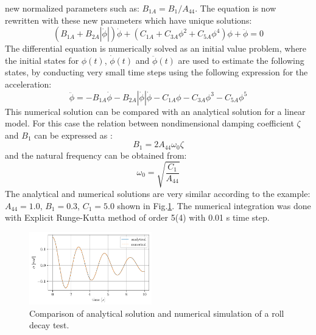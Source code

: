 new normalized parameters such as: $B_{1A} = B_1/A_{44}$. The equation
is now rewritten with these new parameters which have unique solutions:
\begin{equation}
\left(B_{1A} + B_{2A} \left|{\dot{\phi}}\right|\right) \dot{\phi} + \left(C_{1A} + C_{3A} \phi^{2} + C_{5A} \phi^{4}\right) \phi + \ddot{\phi} = 0
\label{eq:roll_decay_equation_quadratic_A}
\end{equation}
The differential equation is numerically solved as an initial value
problem, where the initial states for $\phi(t)$, $\dot{\phi}(t)$ and
$\ddot{\phi}(t)$ are used to estimate the following states, by
conducting very small time steps using the following expression for the
acceleration:
\begin{equation}
\ddot{\phi} = - B_{1A} \dot{\phi} - B_{2A} \left|{\dot{\phi}}\right| \dot{\phi} - C_{1A} \phi - C_{3A} \phi^{3} - C_{5A} \phi^{5}
\label{eq:eq_phi1d}
\end{equation}
This numerical solution can be compared with an analytical solution
\citep{7505983/KL7A3RIV} for a linear model.
For this
case the relation between nondimensional damping coefficient $\zeta$
and $B_1$ can be expressed as \citep{7505983/FB64RGPF}:
\begin{equation}
B_{1} = 2 A_{44} \omega_{0} \zeta
\label{eq:B_1_zeta_eq}
\end{equation}
and the natural frequency can be obtained from:
\begin{equation}
\omega_{0} = \sqrt{\frac{C_{1}}{A_{44}}}
\label{eq:omega0_eq}
\end{equation}
The analytical and numerical solutions are very similar according to the
example: $A_{44} = 1.0$, $B_1 = 0.3$, $C_1 = 5.0$ shown in
Fig.\ref{fig:analytical_numerical}. The numerical integration
was done with Explicit Runge-Kutta method of order 5(4) with 0.01 s time
step.
\begin{figure}[H]
\begin{center}\includegraphics[width = 0.475\textwidth]{figures/analytical_numerical.pdf}\end{center}
\vspace{-0.7cm}
\caption{Comparison of analytical solution and numerical simulation of a roll decay test.}
\label{fig:analytical_numerical}
\end{figure}
